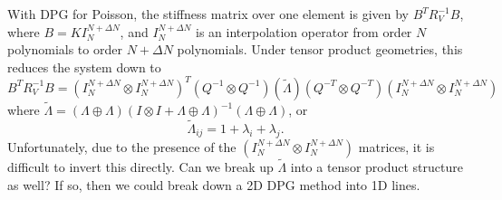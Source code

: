 \documentclass{article}
\begin{document}
With DPG for Poisson, the stiffness matrix over one element is given by $B^TR_V^{-1}B$, where $B = KI_N^{N+\Delta N}$, and $I_N^{N+\Delta N}$ is an interpolation operator from order $N$ polynomials to order ${N+\Delta N}$ polynomials.  Under tensor product geometries, this reduces the system down to 
\[
B^TR_V^{-1}B = (I_N^{N+\Delta N}\otimes I_N^{N+\Delta N})^T (Q^{-1}\otimes Q^{-1}) (\tilde{\Lambda}) (Q^{-T}\otimes Q^{-T})(I_N^{N+\Delta N}\otimes I_N^{N+\Delta N})
\]
where $\tilde{\Lambda} = (\Lambda\oplus \Lambda) (I \otimes I + \Lambda \oplus \Lambda)^{-1}(\Lambda\oplus \Lambda)$, or
\[
\tilde{\Lambda}_{ij} = 1 + \lambda_i + \lambda_j.
\]
Unfortunately, due to the presence of the $(I_N^{N+\Delta N}\otimes I_N^{N+\Delta N})$ matrices, it is difficult to invert this directly.  Can we break up $\tilde{\Lambda}$ into a tensor product structure as well?  If so, then we could break down a 2D DPG method into 1D lines.  
\end{document}
